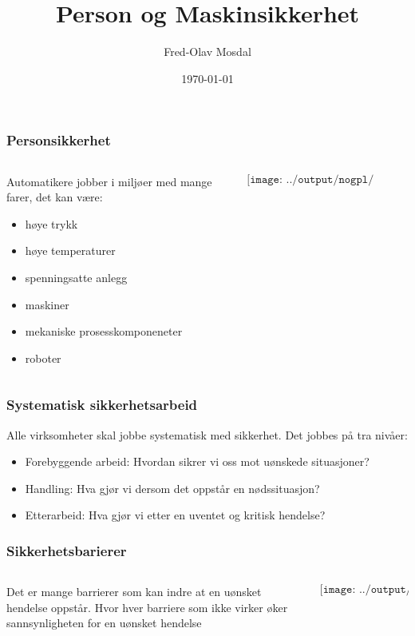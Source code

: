 \documentclass[aspectratio=169,xcolor=dvipsnames]{beamer}
\title[permas]{Person og Maskinsikkerhet} %
\author[Fred-Olav] {Fred-Olav Mosdal}
\institute[Gand VGS] %
{
    Gand VGS \\
    VG3 Automasjon }
\date{\today} %
\begin{document}
\begin{frame}
	\frametitle{Personsikkerhet}
	\begin{columns}
		\begin{column}{0.5\textwidth}
			Automatikere jobber i miljøer med mange farer, det kan være:
		\begin{itemize}
			\item høye trykk
			\item høye temperaturer
			\item spenningsatte anlegg
			\item maskiner
			\item mekaniske prosesskomponeneter
			\item roboter
		\end{itemize}	
		\end{column}

		\begin{column}{0.5\textheight}
	$$\texttt{[image: ../output/nogpl/pPerMasSik01.png]}$$
		\end{column}
	\end{columns}
\end{frame}
\begin{frame}
	\frametitle{Systematisk sikkerhetsarbeid}
	Alle virksomheter skal jobbe systematisk med sikkerhet.
	\vskip 10pt
	Det jobbes på tra nivåer:

	\begin{itemize}
		\item Forebyggende arbeid: Hvordan sikrer vi oss mot uønskede situasjoner?
		\item Handling: Hva gjør vi dersom det oppstår en nødssituasjon?
		\item Etterarbeid: Hva gjør vi etter en uventet og kritisk hendelse?
	\end{itemize}

\end{frame}


\begin{frame}
	\frametitle{Sikkerhetsbarierer}
	\begin{columns}
		\begin{column}{0.5\textwidth}
Det er mange barrierer som kan indre at en uønsket hendelse oppstår. 
\vskip 10pt
Hvor hver barriere som ikke virker øker sannsynligheten for en uønsket hendelse
			
		\end{column}

		\begin{column}{0.5\textwidth}
	$$\texttt{[image: ../output/nogpl/pPerMasSik02.png]}$$
		\end{column}
	\end{columns}
\end{frame}
\end{document}
